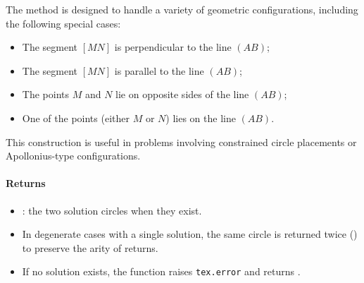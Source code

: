 \medskip
\noindent
The method is designed to handle a variety of geometric configurations, including the following special cases:

\begin{itemize}
  \item The segment $[MN]$ is perpendicular to the line $(AB)$;
  \item The segment $[MN]$ is parallel to the line $(AB)$;
  \item The points $M$ and $N$ lie on opposite sides of the line $(AB)$;
  \item One of the points (either $M$ or $N$) lies on the line $(AB)$.
\end{itemize}

\noindent
This construction is useful in problems involving constrained circle placements or Apollonius-type configurations.

\paragraph*{Returns}
\begin{itemize}
  \item {} : the two solution circles when they exist.
  \item In degenerate cases with a single solution, the same circle is returned twice () to preserve the arity of returns.
  \item If no solution exists, the function raises \verb|tex.error| and returns .
\end{itemize}

\noindent
